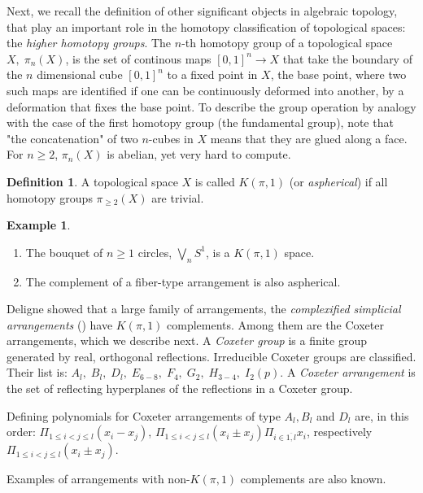 \documentclass[psamsfonts]{conm-p-l}
\theoremstyle{definition}
\newtheorem{definition}[theorem]{Definition}
\newtheorem{example}[theorem]{Example}
\theoremstyle{remark}
\numberwithin{equation}{section}
\begin{document}
Next, we recall the definition of other significant objects in algebraic topology, 
that play an important role in the homotopy classification of topological spaces:
the {\em higher homotopy groups}. The $n$-th homotopy group of
a topological space $X, \; \pi_n(X)$, is the set of continous maps $[0,1]^n \rightarrow X$ 
that take the boundary of the $n$ dimensional cube $[0,1]^n$ to a fixed point in $X$, 
the base point, where two such maps are identified if one 
can be continuously deformed into another, by a deformation that fixes the base point. 
To describe the group operation by analogy with the case of the first homotopy group 
(the fundamental group), note that "the concatenation" of two $n$-cubes in $X$ means 
that they are glued along a face. For $n\ge 2$, $\pi_n(X)$ is abelian, 
yet very hard to compute.

\begin{definition}
\label{high}
A topological space $X$ is called $K(\pi,1)$ (or {\em aspherical}) if all homotopy groups
$\pi_{\geq 2}(X)$ are trivial.
\end{definition}

\begin{example}
\begin{enumerate}
\item \label{wedgeS12}
The bouquet of $n\geq 1$ circles, $\bigvee_{n}S^1$, is a $K(\pi,1)$ space.
\item \label{Kpi2}
The complement of a fiber-type arrangement is also aspherical.
\end{enumerate}
\end{example}

 Deligne showed that a large family of arrangements, the {\it complexified  simplicial arrangements}
 (\cite{De}) have $K(\pi,1)$ complements. Among them are the Coxeter arrangements, 
 which we describe next.
 A {\it Coxeter group} is a finite group generated by real, orthogonal reflections. 
 Irreducible Coxeter groups are classified. Their list is: 
 $A_{l},\;B_{l},\;D_{l},\;E_{6-8},\;F_{4},\;G_{2},\;H_{3-4},\;I_{2}(p)$. A {\it Coxeter arrangement}
 is the set of reflecting hyperplanes of the reflections in a Coxeter group.

Defining polynomials for Coxeter arrangements of type $A_l,  B_l$ and $D_l$ are, in this order:
$\Pi_{1\le i <j\le l}(x_i-x_j)$, $\Pi_{1\le i< j\le l}(x_i\pm x_j)\Pi_{i \in \overline{1,l}}x_i$, 
respectively $\Pi_{1\le i <j\le l}(x_i \pm x_j)$.

Examples of arrangements with non-$K(\pi,1)$ complements are also known.
\end{document}
